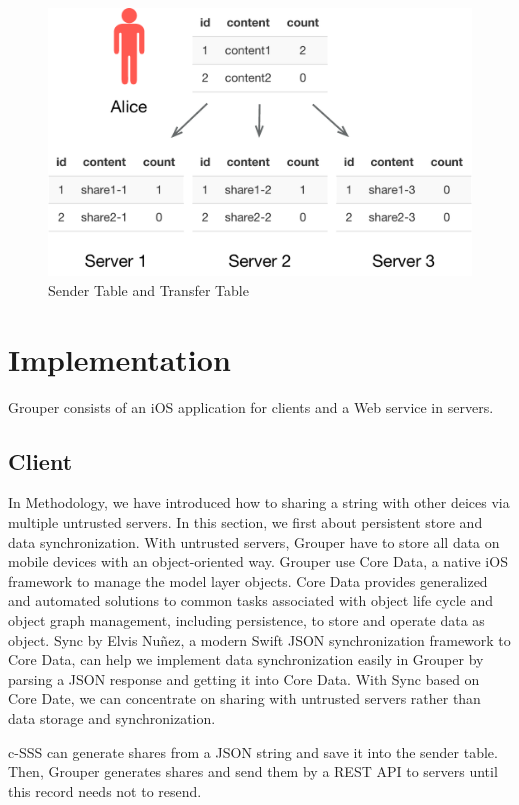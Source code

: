 \documentclass[twocolumn,10pt]{article}
\begin{document}
\begin{figure}[t]
\centering
\includegraphics[scale=0.4]{sync_table}
\caption{Sender Table and Transfer Table}
\end{figure}

\section{Implementation}
Grouper consists of an iOS application for clients and a Web service in servers.

\subsection{Client}
In Methodology, we have introduced how to sharing a string with other deices via multiple untrusted servers. In this section, we first about persistent store and data synchronization. With untrusted servers, Grouper have to store all data on mobile devices with an object-oriented way. Grouper use Core Data\cite{coredata}, a native iOS framework to manage the model layer objects. Core Data provides generalized and automated solutions to common tasks associated with object life cycle and object graph management, including persistence, to store and operate data as object. Sync\cite{sync} by Elvis Nuñez, a modern Swift JSON synchronization framework to Core Data, can help we implement data synchronization easily in Grouper by parsing a JSON response and getting it into Core Data. With Sync based on Core Date, we can concentrate on sharing with untrusted servers rather than data storage and synchronization.

c-SSS can generate shares from a JSON string and save it into the sender table. Then, Grouper generates shares and send them by a REST API to servers until this record needs not to resend.
\end{document}
